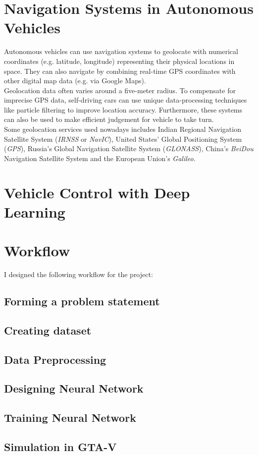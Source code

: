 \section{Navigation Systems in Autonomous Vehicles}
Autonomous vehicles can use navigation systems to geolocate with numerical coordinates (e.g. latitude, longitude) representing their physical locations in space. They can also navigate by combining real-time GPS coordinates with other digital map data (e.g. via Google Maps).
\\
Geolocation data often varies around a five-meter radius. To compensate for imprecise GPS data, self-driving cars can use unique data-processing techniques like particle filtering to improve location accuracy. Furthermore, these systems can also be used to make efficient judgement for vehicle to take turn.
\\
Some geolocation services used nowadays includes  Indian Regional Navigation Satellite System (\textit{IRNSS} or \textit{NavIC}), United States' Global Positioning System (\textit{GPS}), Russia's Global Navigation Satellite System (\textit{GLONASS}), China's \textit{BeiDou} Navigation Satellite System and the European Union's \textit{Galileo}.

\section{Vehicle Control with Deep Learning}

\section{Workflow}
I designed the following workflow for the project:

\subsection{Forming a problem statement}

\subsection{Creating dataset}

\subsection{Data Preprocessing}

\subsection{Designing Neural Network}

\subsection{Training Neural Network}

\subsection{Simulation in GTA-V}